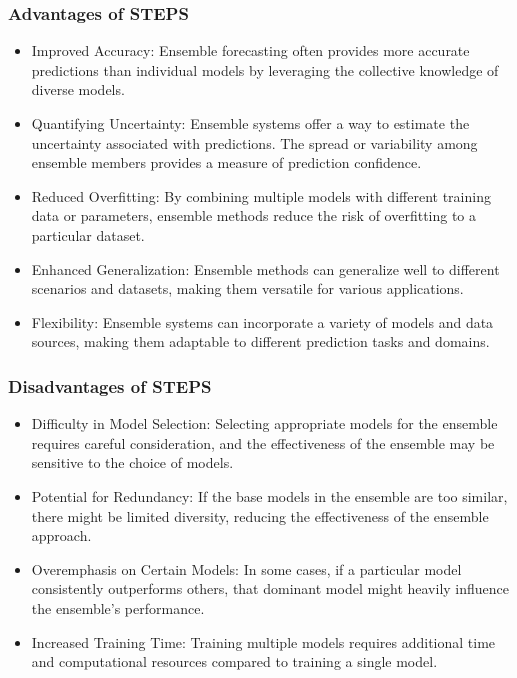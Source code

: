 \documentclass[../paper.tex]{subfiles}
\begin{document}
    \subsubsection{Advantages of STEPS}
        \begin{itemize}
            \item Improved Accuracy:
            Ensemble forecasting often provides more accurate predictions than individual models
            by leveraging the collective knowledge of diverse models.

            \item Quantifying Uncertainty: Ensemble systems offer a way to estimate the uncertainty associated with predictions.
            The spread or variability among ensemble members provides a measure of prediction confidence.

            \item Reduced Overfitting:
            By combining multiple models with different training data or parameters,
            ensemble methods reduce the risk of overfitting to a particular dataset.

            \item Enhanced Generalization: Ensemble methods can generalize well to different scenarios and datasets,
            making them versatile for various applications.

            \item Flexibility: Ensemble systems can incorporate a variety of models and data sources,
            making them adaptable to different prediction tasks and domains.
        \end{itemize}
        \subsubsection{Disadvantages of STEPS}
        \begin{itemize}
            \item Difficulty in Model Selection:
            Selecting appropriate models for the ensemble requires careful consideration,
            and the effectiveness of the ensemble may be sensitive to the choice of models.

            \item Potential for Redundancy: If the base models in the ensemble are too similar,
            there might be limited diversity, reducing the effectiveness of the ensemble approach.

            \item Overemphasis on Certain Models:
            In some cases, if a particular model consistently outperforms others,
            that dominant model might heavily influence the ensemble's performance.

            \item Increased Training Time:
            Training multiple models requires additional time and computational resources compared to training a single model.
        \end{itemize}
\end{document}
